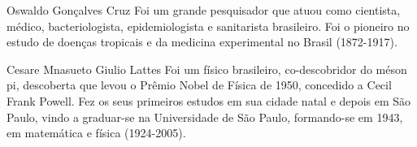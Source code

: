 \documentclass[journal]{IEEEtran}									%
\begin{document}
\begin{IEEEbiography}
{Oswaldo Gonçalves Cruz}
Foi um grande pesquisador que atuou como cientista, médico, bacteriologista, epidemiologista e sanitarista brasileiro. Foi o pioneiro no estudo de doenças tropicais e da medicina experimental no Brasil (1872-1917).
\end{IEEEbiography}

\begin{IEEEbiography}
{Cesare Mnasueto Giulio Lattes}
Foi um físico brasileiro, co-descobridor do méson pi, descoberta que levou o Prêmio Nobel de Física de 1950, concedido a Cecil Frank Powell. Fez os seus primeiros estudos em sua cidade natal e depois em São Paulo, vindo a graduar-se na Universidade de São Paulo, formando-se em 1943, em matemática e física (1924-2005).
\end{IEEEbiography}

\end{document}
